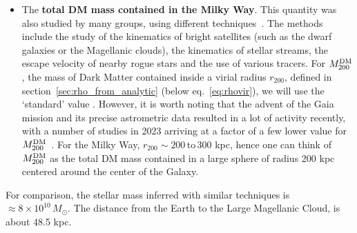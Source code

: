 \begin{itemize}
\item[B)] The {\bf total DM mass contained in the Milky Way}. This quantity was also studied by many groups, using different techniques~\cite{MWmass}. The methods include the study of the kinematics of bright satellites (such as the dwarf galaxies or the Magellanic clouds), the kinematics of stellar streams, the escape velocity of nearby rogue stars and the use of various tracers.
For $M^{\rm DM}_{200}$, the mass of Dark Matter contained inside a virial radius $r_{200}$, defined in section~\ref{sec:rho_from_analytic} (below eq.~\eqref{eq:rhovir}), we will use 
 the `standard' value
\beq
\label{eq:M200:value}
.
\eeq
However, it is worth noting that the advent of the {\sc Gaia} mission and its precise astrometric data resulted in a lot of activity recently, with a number of studies in 
2023 arriving at a factor of a few lower value for $M^{\rm DM}_{200}$~\cite{rotation_curves}. 
For the Milky Way,
$r_{200}\sim 200\,\text{to}\,300$ kpc, hence one can think of $M^{\rm DM}_{200}$ as the total DM mass contained in a large sphere of radius 200 kpc centered around the center of the Galaxy.
\end{itemize}
For comparison, the stellar mass inferred with similar techniques is $\approx 8 \times 10^{10}\, M_\odot$. The distance from the Earth to the Large Magellanic Cloud, is about 48.5 kpc.

\medskip

